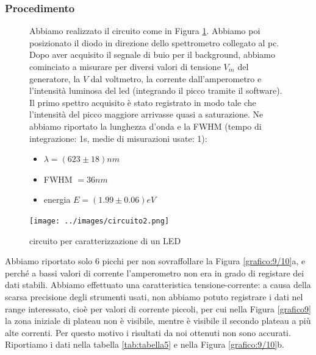 \documentclass{article}
\begin{document}
\subsubsection{Procedimento}

\begin{figure}[h]
    \begin{minipage}{0.7\textwidth} %
        Abbiamo realizzato il circuito come in Figura \ref{circuito:4}. Abbiamo poi posizionato il diodo in direzione dello spettrometro collegato al pc. Dopo aver acquisito il segnale di buio per il background, abbiamo cominciato a misurare per diversi valori di tensione $V_{in}$  del generatore, la $V$ dal voltmetro, la corrente dall'amperometro e l'intensità luminosa del led (integrando il picco tramite il software). Il primo spettro acquisito è stato registrato in modo tale che l'intensità del picco maggiore arrivasse quasi a saturazione. Ne abbiamo riportato la lunghezza d'onda e la FWHM (tempo di integrazione: 1s, medie di misurazioni usate: 1):
        \begin{itemize}
            \item $\lambda=(623\pm18)  nm$
            \item FWHM $=36  nm$
            \item energia $E=  (1.99\pm0.06 )eV$
        \end{itemize}
    \end{minipage}
    \hfill %
    \begin{minipage}{0.25\textwidth} %
        \centering
        \texttt{[image: ../images/circuito2.png]} %
        \caption{circuito per caratterizzazione di un LED}
        \label{circuito:4}
    \end{minipage}
\end{figure}

Abbiamo riportato solo 6 picchi per non sovraffollare la Figura \ref{grafico:9/10}a, e perché a bassi valori di corrente l'amperometro non era in grado di registare dei dati stabili.
Abbiamo effettuato una caratteristica tensione-corrente: a causa della scarsa precisione degli strumenti usati, non abbiamo potuto registrare i dati nel range interessato, cioè per valori di corrente piccoli, per cui nella Figura \ref{grafico9} la zona iniziale di plateau non è visibile, mentre è visibile il secondo plateau a più alte correnti. Per questo motivo i risultati da noi ottenuti non sono accurati. Riportiamo i dati nella tabella \ref{tab:tabella5} e nella Figura \ref{grafico:9/10}b.
\end{document}
